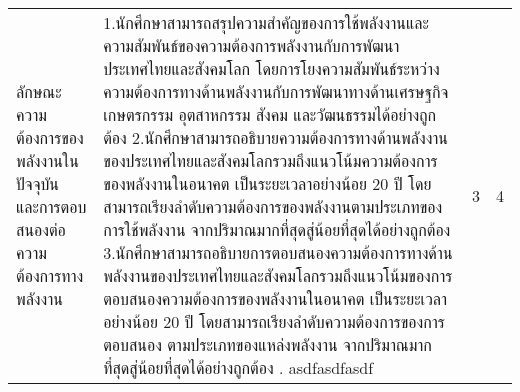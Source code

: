 \documentclass[a4paper,12pt]{article}
\begin{document}
\begin{enumerate}[label=\textbf{\arabic*},leftmargin=*]
\begin{flushleft}
\begin{tabularx}{\textwidth}{|p{2cm}|p{4cm}|X|p{3cm}|}
ลักษณะความต้องการของพลังงานในปัจจุบัน และการตอบสนองต่อความต้องการทางพลังงาน &

1.นักศึกษาสามารถสรุปความสำคัญของการใช้พลังงานและความสัมพันธ์ของความต้องการพลังงานกับการพัฒนาประเทศไทยและสังคมโลก โดยการโยงความสัมพันธ์ระหว่างความต้องการทางด้านพลังงานกับการพัฒนาทางด้านเศรษฐกิจ เกษตรกรรม อุตสาหกรรม สังคม และวัฒนธรรมได้อย่างถูกต้อง \newline
2.นักศึกษาสามารถอธิบายความต้องการทางด้านพลังงานของประเทศไทยและสังคมโลกรวมถึงแนวโน้มความต้องการของพลังงานในอนาคต เป็นระยะเวลาอย่างน้อย 20 ปี โดยสามารถเรียงลำดับความต้องการของพลังงานตามประเภทของการใช้พลังงาน จากปริมาณมากที่สุดสู่น้อยที่สุดได้อย่างถูกต้อง \newline
3.นักศึกษาสามารถอธิบายการตอบสนองความต้องการทางด้านพลังงานของประเทศไทยและสังคมโลกรวมถึงแนวโน้มของการตอบสนองความต้องการของพลังงานในอนาคต เป็นระยะเวลาอย่างน้อย 20 ปี โดยสามารถเรียงลำดับความต้องการของการตอบสนอง ตามประเภทของแหล่งพลังงาน จากปริมาณมากที่สุดสู่น้อยที่สุดได้อย่างถูกต้อง \newline
2. asdfasdfasdf
&3 &4

\end{tabularx}
\end{flushleft}
\end{enumerate}
\end{document}
